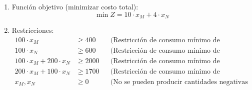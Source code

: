 \documentclass[../main.tex]{subfiles}
\begin{document}
\begin{exercise}
\begin{enumerate}
                \item Función objetivo (minimizar costo total):
                    \begin{equation}
                        \min Z = 10 \cdot x_M + 4 \cdot x_N
                    \end{equation}
                \item Restricciones:
                    \begin{equation}
                        \begin{aligned}
                            100 \cdot x_M &\geq 400 && \text{(Restricción de consumo mínimo de nutriente A)} \\
                            100 \cdot x_N &\geq 600 && \text{(Restricción de consumo mínimo de nutriente B)}\\
                            100 \cdot x_M + 200 \cdot x_N &\geq 2000 && \text{(Restricción de consumo mínimo de nutriente C)}\\
                            200 \cdot x_M + 100 \cdot x_N &\geq 1700 && \text{(Restricción de consumo mínimo de nutriente D)}\\
                            x_M, x_N & \geq 0 && \text{(No se pueden producir cantidades negativas de productos)}\\
                        \end{aligned}
                    \end{equation}
                
            \end{enumerate}
        \end{exercise}
\end{document}
